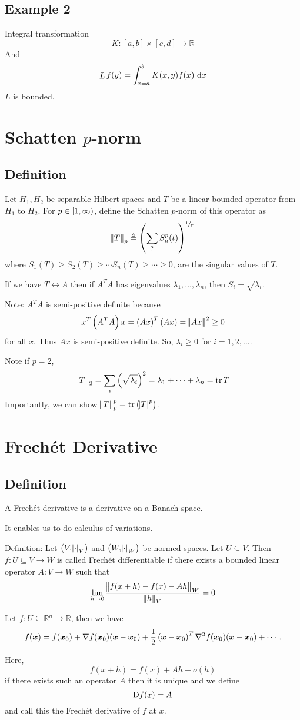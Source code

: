 \documentclass{article}
\DeclareMathOperator{\trace}{tr}
\newcommand{\RR}{\mathbb{R}}
\begin{document}
\subsection{Example 2}
Integral transformation
\[K: [a, b ] \times [c, d] \to \RR\]
And
\[\mathop{L} f(y)  = \int_{x=a}^b K(x, y)f(x)\, \dif x\]
\(L\) is bounded.

\section{Schatten \(p\)-norm}

\subsection{Definition}

Let \(H_1, H_2\) be separable Hilbert spaces and \(T\) be a linear bounded operator from \(H_1\) to \(H_2\).
For \(p \in \intco{1, \infty}\), define the Schatten \(p\)-norm of this operator as
\[\norm{T}_p \triangleq \del{\sum_{?}S_n^p(t)}^{\sfrac{1}{p}}\]
where \(S_1(T) \geq S_2(T) \geq \cdots S_n(T) \geq \cdots \geq 0\), are the singular values of \(T\).

If we have \(T \leftrightarrow A\) then if \(A^TA\) has eigenvalues \(\lambda_1, \dots, \lambda_n\), then \(S_i = \sqrt{\lambda_i}\).

Note: \(A^TA\) is semi-positive definite because
\[x^T\del{A^TA}x = \del{Ax}^T\del{Ax} = \norm{Ax}^2 \geq 0\]
for all \(x\).
Thus \(Ax\) is semi-positive definite.
So, \(\lambda_i \geq 0\) for \(i = 1, 2, \dots\).

Note if \(p = 2\),
\[\norm{T}_2 = \sum_i \del{\sqrt{\lambda_i}}^2 = \lambda_1 + \dots + \lambda_n = \trace T\]
Importantly, we can show \(\norm{T}_p^p = \trace\del{\abs{T}^p}\).

\section{Frech\'et Derivative}

\subsection{Definition}

A Frech\'et derivative is a derivative on a Banach space.

It enables us to do calculus of variations.

Definition: Let \(\del{V, \abs{\cdot}_V}\) and \(\del{W, \abs{\cdot}_W}\) be normed spaces.
Let \(U \subseteq V\). Then \(f: U \subseteq V \to W\) is called Frech\'et differentiable if there exists a bounded linear operator \(A: V \to W\) such that
\[\lim_{h \to 0} \frac{\norm{f(x+h) - f(x) - A h}_W}{\norm{h}_V} = 0\]
\begin{aside}[Recall:]
  Let \(f: U \subseteq \RR^n \to \RR\), then we have
  \[f(\bm x) = f(\bm x_0) + \nabla f(\bm x_0)(\bm x - \bm x_0) + \frac{1}{2}\del{\bm x - \bm x_0}^T \nabla^2 f(\bm x_0)(\bm x - \bm x_0) + \cdots.\]
\end{aside}
Here,
\[f(x + h) = f(x) + Ah + o(h)\]
if there exists such an operator \(A\) then it is unique and we define
\[\Dif f(x) = A\]
and call this the Frech\'et derivative of \(f\) at \(x\).
\end{document}
